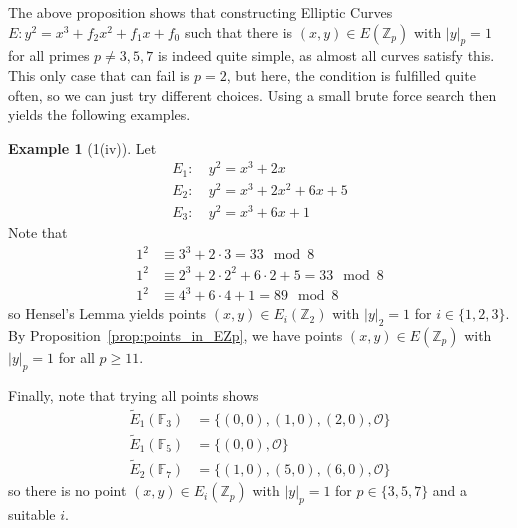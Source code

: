 \documentclass{scrartcl}
\newcommand{\Z}{\mathbb{Z}}
\newcommand{\F}{\mathbb{F}}
\renewcommand{\O}{\mathcal{O}}
\theoremstyle{definition}
\newtheorem{example}[subsection]{Example}
\begin{document}
The above proposition shows that constructing Elliptic Curves $E: y^2 = x^3 + f_2 x^2 + f_1 x + f_0$ such that there is $(x, y) \in E(\Z_p)$ with $|y|_p = 1$ for all primes $p \neq 3, 5, 7$ is indeed quite simple, as almost all curves satisfy this.
This only case that can fail is $p = 2$, but here, the condition is fulfilled quite often, so we can just try different choices.
Using a small brute force search then yields the following examples.
\begin{example}[1(iv)]
    Let
    \begin{align*}
        E_1: \ &y^2 = x^3 + 2 x \\
        E_2: \ &y^2 = x^3 + 2 x^2 + 6 x + 5\\
        E_3: \ &y^2 = x^3 + 6x + 1
    \end{align*}
    Note that
    \begin{align*}
        1^2 &\equiv 3^3 + 2 \cdot 3 = 33 \mod 8 \\
        1^2 &\equiv 2^3 + 2 \cdot 2^2 + 6 \cdot 2 + 5 = 33 \mod 8 \\
        1^2 &\equiv 4^3 + 6 \cdot 4 + 1 = 89 \mod 8
    \end{align*}
    so Hensel's Lemma yields points $(x, y) \in E_i(\Z_2)$ with $|y|_2 = 1$ for $i \in \{1, 2, 3\}$.
    By Proposition~\ref{prop:points_in_EZp}, we have points $(x, y) \in E(\Z_p)$ with $|y|_p = 1$ for all $p \geq 11$.

    Finally, note that trying all points shows
    \begin{align*}
        \tilde{E}_1(\F_3) &= \{ (0, 0), (1, 0), (2, 0), \O \} \\
        \tilde{E}_1(\F_5) &= \{ (0, 0), \O \} \\
        \tilde{E}_2(\F_7) &= \{ (1, 0), (5, 0), (6, 0), \O \}
    \end{align*}
    so there is no point $(x, y) \in E_i(\Z_p)$ with $|y|_p = 1$ for $p \in \{3, 5, 7\}$ and a suitable $i$. 
\end{example}
\end{document}
